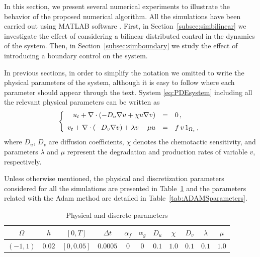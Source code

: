 \documentclass[11pt]{article}
\def \hueco{\noalign{\medskip}}
\def \beq{\begin{equation}}
\def \eeq{\end{equation}}
\def \ba{\begin{array}}
\def \ea{\end{array}}
\numberwithin{theorem}{section}
\begin{document}
In this section, we present several numerical experiments to illustrate the behavior of the proposed numerical algorithm. All the simulations have been carried out using MATLAB software \cite{Matlab}. First, in Section~\ref{subsec:simbilinear} we investigate the effect of considering a bilinear distributed control in the dynamics of the system. Then, in Section~\ref{subsec:simboundary} we study the effect of introducing a boundary control on the system. 

In previous sections, in order to simplify the notation we omitted to write the physical parameters of the system, although it is easy to follow where each parameter should appear through the text. System \eqref{eq:PDEsystem} including all the relevant physical parameters can be written as
\beq
\left\{\ba{rcl}
u_t + \nabla\cdot (-D_u\nabla u + \chi u \nabla v) 
&=&
0\,,
\\ \hueco
v_t + \nabla\cdot (-D_v\nabla v) + \lambda v - \mu u
&=&
 f\, v\, 1_{\Omega_c}\,,
\ea\right.
\eeq
where $D_u$, $D_v$ are diffusion coefficients, $\chi$ denotes the chemotactic sensitivity, and parameters $\lambda$ and $\mu$  represent the degradation and production rates of variable $v$, respectively.

Unless otherwise mentioned, the physical and discretization parameters considered for all the simulations are presented in Table~\ref{tab:physdiscparameters} and the parameters related with the Adam method are detailed in Table~\ref{tab:ADAMSparameters}.

\begin{table}[H]
\begin{center}
\begin{tabular}{|c|c|c|c|c|c|c|c|c|c|c|}
\hline
$\Omega$ & $h$ & $[0,T]$ & $\Delta t$ & $\alpha_f$ & $\alpha_g$ 
& $D_u$  & $\chi$ & $D_v$ & $\lambda$ & $\mu$
 \\
\hline
$(-1, 1)$ & $0.02$ & $[0,0.05]$ 	& $0.0005$ & 0 &  0 
& $0.1$ & $1.0$ & $0.1$ & $0.1$ & $1.0$ 
 \\
 \hline
\end{tabular}
\caption{Physical and discrete parameters}
\label{tab:physdiscparameters}
\end{center}
\end{table}
\end{document}
